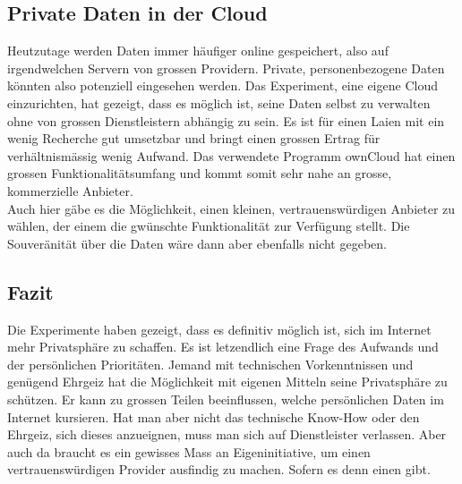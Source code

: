\subsection{Private Daten in der Cloud}
Heutzutage werden Daten immer häufiger online gespeichert, also auf irgendwelchen Servern von grossen Providern. 
Private, personenbezogene Daten könnten also potenziell eingesehen werden. Das Experiment, eine eigene Cloud einzurichten, hat gezeigt, dass es möglich ist, seine Daten selbst zu verwalten ohne von grossen Dienstleistern abhängig zu sein.
Es ist für einen Laien mit ein wenig Recherche gut umsetzbar und bringt einen grossen Ertrag für verhältnismässig wenig Aufwand.
Das verwendete Programm ownCloud hat einen grossen Funktionalitätsumfang und kommt somit sehr nahe an grosse, kommerzielle Anbieter.
\\
Auch hier gäbe es die Möglichkeit, einen kleinen, vertrauenswürdigen Anbieter zu wählen, der einem die gwünschte Funktionalität zur Verfügung stellt.
Die Souveränität über die Daten wäre dann aber ebenfalls nicht gegeben.

\subsection{Fazit}
Die Experimente haben gezeigt, dass es definitiv möglich ist, sich im Internet mehr Privatsphäre zu schaffen.
Es ist letzendlich eine Frage des Aufwands und der persönlichen Prioritäten. Jemand mit technischen Vorkenntnissen und genügend Ehrgeiz hat die Möglichkeit mit eigenen Mitteln seine Privatsphäre zu schützen. Er kann zu grossen Teilen beeinflussen, welche persönlichen Daten im Internet kursieren. Hat man aber nicht das technische Know-How oder den Ehrgeiz, sich dieses anzueignen, muss man sich auf Dienstleister verlassen. Aber auch da braucht es ein gewisses Mass an Eigeninitiative, um einen vertrauenswürdigen Provider ausfindig zu machen. Sofern es denn einen gibt.
